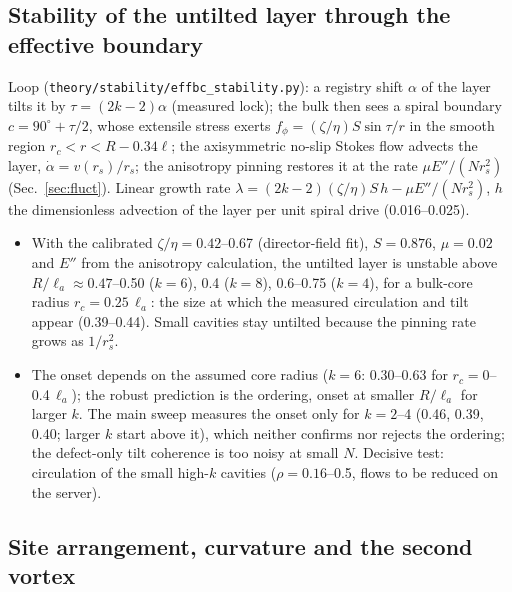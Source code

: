 \subsection{Stability of the untilted layer through the effective boundary}\label{sec:effstab}
Loop (\texttt{theory/stability/effbc\_stability.py}): a registry shift $\alpha$ of the layer tilts it by $\tau=(2k-2)\alpha$ (measured lock); the bulk then sees
a spiral boundary $c=90^\circ+\tau/2$, whose extensile stress exerts $f_\phi=(\zeta/\eta)S\sin\tau/r$ in the smooth region $r_c<r<R-0.34\ell$; the axisymmetric
no-slip Stokes flow advects the layer, $\dot\alpha=v(r_s)/r_s$; the anisotropy pinning restores it at the rate $\mu E''/(Nr_s^2)$ (Sec.~\ref{sec:fluct}). Linear
growth rate $\lambda=(2k-2)(\zeta/\eta)S\,h-\mu E''/(Nr_s^2)$, $h$ the dimensionless advection of the layer per unit spiral drive (0.016--0.025).
\begin{itemize}
  \item With the calibrated $\zeta/\eta=0.42$--0.67 (director-field fit), $S=0.876$, $\mu=0.02$ and $E''$ from the anisotropy calculation, the untilted layer is
        unstable above $R/\ell_a\approx0.47$--0.50 ($k=6$), 0.4 ($k=8$), 0.6--0.75 ($k=4$), for a bulk-core radius $r_c=0.25\,\ell_a$: the size at which the measured
        circulation and tilt appear (0.39--0.44). Small cavities stay untilted because the pinning rate grows as $1/r_s^2$.
  \item The onset depends on the assumed core radius ($k=6$: 0.30--0.63 for $r_c=0$--0.4\,$\ell_a$); the robust prediction is the ordering, onset at smaller
        $R/\ell_a$ for larger $k$. The main sweep measures the onset only for $k=2$--4 (0.46, 0.39, 0.40; larger $k$ start above it), which neither confirms
        nor rejects the ordering; the defect-only tilt coherence is too noisy at small $N$. Decisive test: circulation of the small high-$k$ cavities
        ($\rho=0.16$--0.5, flows to be reduced on the server).
\end{itemize}

\subsection{Site arrangement, curvature and the second vortex}\label{sec:sitecurv}
